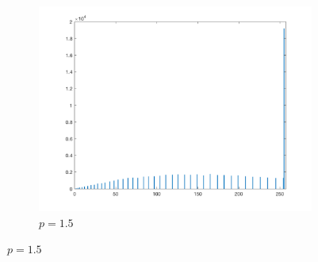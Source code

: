 \documentclass{article}
\begin{document}
\begin{enumerate}[label=(\alph*)]
\begin{figure}[!htb]
\begin{subfigure}[b]{0.3\textwidth}
            \includegraphics[width=\textwidth]{img/hist_PL15.png}
            \caption{$p = 1.5$}
        \end{subfigure}
        
        

\end{figure}
\end{enumerate}
\end{document}
